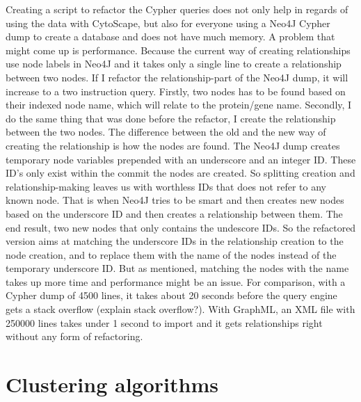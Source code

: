 \documentclass[UKenglish]{ifimaster}
\begin{document}
Creating a script to refactor the Cypher queries does not only help in regards
of using the data with CytoScape, but also for everyone using a Neo4J Cypher
dump to create a database and does not have much memory. A problem that might
come up is performance. Because the current way of creating relationships use
node labels in Neo4J and it takes only a single line to create a relationship
between two nodes. If I refactor the relationship-part of the Neo4J dump, it
will increase to a two instruction query. Firstly, two nodes has to be found
based on their indexed node name, which will relate to the protein/gene name.
Secondly, I do the same thing that was done before the refactor, I create the
relationship between the two nodes. The difference between the old and the new
way of creating the relationship is how the nodes are found. The Neo4J dump
creates temporary node variables prepended with an underscore and an integer ID.
These ID's only exist within the commit the nodes are created. So splitting
creation and relationship-making leaves us with worthless IDs that does not
refer to any known node. That is when Neo4J tries to be smart and then creates
new nodes based on the underscore ID and then creates a relationship between
them. The end result, two new nodes that only contains the undescore IDs. So the
refactored version aims at matching the underscore IDs in the relationship
creation to the node creation, and to replace them with the name of the nodes
instead of the temporary underscore ID. But as mentioned, matching the nodes
with the name takes up more time and performance might be an issue. For
comparison, with a Cypher dump of 4500 lines, it takes about 20 seconds before
the query engine gets a stack overflow (explain stack overflow?). With GraphML,
an XML file with 250000 lines takes under 1 second to import and it gets
relationships right without any form of refactoring.

\chapter{Clustering algorithms}
\end{document}
